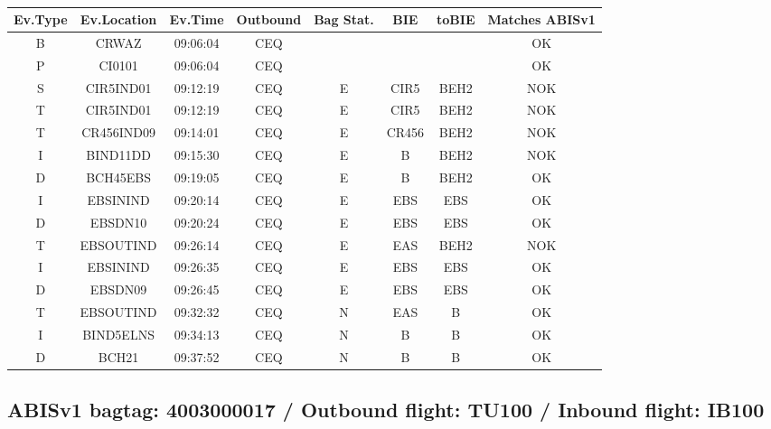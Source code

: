\documentclass{report}
\begin{document}
\paragraph{}
\begin{longtable}{cccccccc}    \toprule
\rowcolor{white!50}
\textbf{Ev.Type} & \textbf{Ev.Location} & \textbf{Ev.Time} & \textbf{Outbound} & \textbf{Bag Stat.} & \textbf{BIE} & \textbf{toBIE} & \textbf{Matches ABISv1} \\\midrule
B & CRWAZ & 09:06:04  & CEQ &  &  &  & OK\\
P & CI0101 & 09:06:04  & CEQ &  &  &  & OK\\
S & CIR5IND01 & 09:12:19  & CEQ & E & CIR5 & BEH2 & NOK\\
T & CIR5IND01 & 09:12:19  & CEQ & E & CIR5 & BEH2 & NOK\\
T & CR456IND09 & 09:14:01  & CEQ & E & CR456 & BEH2 & NOK\\
I & BIND11DD & 09:15:30  & CEQ & E & B & BEH2 & NOK\\
D & BCH45EBS & 09:19:05  & CEQ & E & B & BEH2 & OK\\
I & EBSININD & 09:20:14  & CEQ & E & EBS & EBS & OK\\
D & EBSDN10 & 09:20:24  & CEQ & E & EBS & EBS & OK\\
T & EBSOUTIND & 09:26:14  & CEQ & E & EAS & BEH2 & NOK\\
I & EBSININD & 09:26:35  & CEQ & E & EBS & EBS & OK\\
D & EBSDN09 & 09:26:45  & CEQ & E & EBS & EBS & OK\\
T & EBSOUTIND & 09:32:32  & CEQ & N & EAS & B & OK\\
I & BIND5ELNS & 09:34:13  & CEQ & N & B & B & OK\\
D & BCH21 & 09:37:52  & CEQ & N & B & B & OK\\
\bottomrule
\end{longtable}
\subsection*{ABISv1 bagtag: 4003000017 / Outbound flight: TU100 / Inbound flight: IB100}
\end{document}
